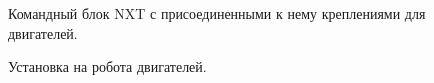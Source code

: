 \documentclass[12pt,a4paper,openany]{extarticle}
\begin{document}
\begin{figure}[h]
	\begin{minipage}[h]{0.49\linewidth}
	\end{minipage}
	\hfill
	\begin{minipage}[h]{0.49\linewidth}
	\end{minipage}
	\caption{Командный блок NXT с присоединенными к нему креплениями для двигателей.}
\end{figure}
\vfill

\begin{figure}[h]
	\noindent{}
	\caption{Установка на робота двигателей.}
\end{figure}
\end{document}
